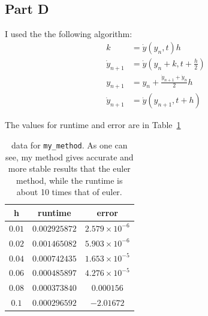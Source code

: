 \documentclass[12pt, a4paper]{article}
\begin{document}
	\subsection{Part D}
	I used the the following algorithm:
	\begin{equation}
		\begin{aligned}
			k &= \dot{y}(y_n, t) h\\
			\dot{y}_{n+1} &= \dot{y}(y_n + k, t + \frac{h}{2}) \\
			y_{n+1} &= y_n + \frac{\dot{y}_{n + 1} + \dot{y}_n}{2}  h\\
			\dot{y}_{n+1} &= \dot{y}(y_{n+1}, t + h) 
		\end{aligned}
	\end{equation}

	The values for runtime and error are in Table~\ref{tab:my_method}
	
		\begin{table}[h!]
		\centering
		\begin{tabular}{|c|c|c|}
			\hline
			h & runtime & error \\
			\hline
			$0.01$ & $0.002925872$ & $2.579 \times 10 ^{-6}$ \\
			\hline
			$0.02$ & $0.001465082$ & $5.903 \times 10 ^{-6}$ \\
			\hline
			$0.04$ & $0.000742435$ & $1.653 \times 10 ^{-5}$ \\
			\hline
			$0.06$ & $0.000485897$ & $4.276 \times 10 ^{-5}$  \\
			\hline
			$0.08$ &$0.000373840$ & $0.000156$  \\
			\hline
			$0.1$ &$0.000296592$  & $-2.01672$  \\
			\hline
		\end{tabular}
		\caption{data for \texttt{my\_method}. As one can see, my method gives accurate and more stable results that the euler method, while the 
			runtime is about 10 times that of euler.}
		\label{tab:my_method}
	\end{table}
\end{document}
